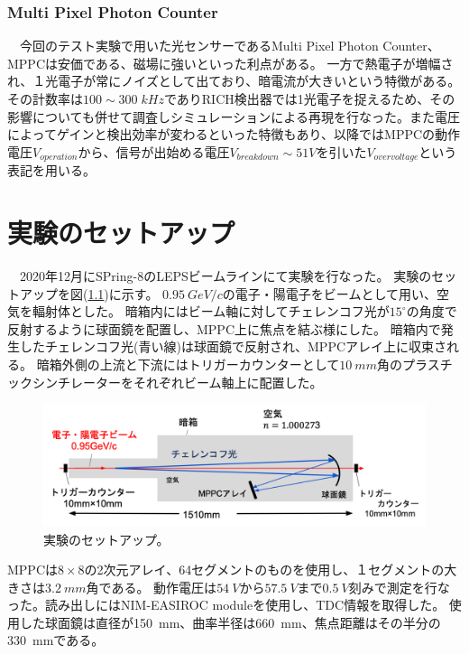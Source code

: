 \documentclass[uplatex, titlepage, dvipdfmx, 12pt, a4paper]{jsreport}
\begin{document}
\subsection{Multi Pixel Photon Counter}
　今回のテスト実験で用いた光センサーであるMulti Pixel Photon Counter、MPPCは安価である、磁場に強いといった利点がある。
一方で熱電子が増幅され、１光電子が常にノイズとして出ており、暗電流が大きいという特徴がある。
その計数率は$100\sim 300\; \si{kHz}$でありRICH検出器では1光電子を捉えるため、その影響についても併せて調査しシミュレーションによる再現を行なった。また電圧によってゲインと検出効率が変わるといった特徴もあり、以降ではMPPCの動作電圧$V_{operation}$から、信号が出始める電圧$V_{breakdown}\sim51V$を引いた$V_{over voltage}$という表記を用いる。
\chapter{実験のセットアップ}
　2020年12月にSPring-8のLEPSビームラインにて実験を行なった。
  実験のセットアップを図(\ref{fig:setup})に示す。
  $\SI{0.95}{GeV/c}$の電子・陽電子をビームとして用い、空気を輻射体とした。
  暗箱内にはビーム軸に対してチェレンコフ光が$15^\circ$の角度で反射するように球面鏡を配置し、MPPC上に焦点を結ぶ様にした。
  暗箱内で発生したチェレンコフ光(青い線)は球面鏡で反射され、MPPCアレイ上に収束される。
  暗箱外側の上流と下流にはトリガーカウンターとして$\SI{10}{mm}$角のプラスチックシンチレーターをそれぞれビーム軸上に配置した。

\begin{figure}[htbp]
  \begin{center} 
    \includegraphics[clip, scale=0.6]{image/setup.png}
    \caption{実験のセットアップ。}
    \label{fig:setup} 
  \end{center}
\end{figure}
MPPCは$8\times8$の2次元アレイ、64セグメントのものを使用し、１セグメントの大きさは$\SI{3.2}{mm}$角である。
動作電圧は$\SI{54}{V}$から$\SI{57.5}{V}$まで$\SI{0.5}{V}$刻みで測定を行なった。読み出しにはNIM-EASIROC moduleを使用し、TDC情報を取得した。
使用した球面鏡は直径が\SI{150}{mm}、曲率半径は\SI{660}{mm}、焦点距離はその半分の\SI{330}{mm}である。
\end{document}
